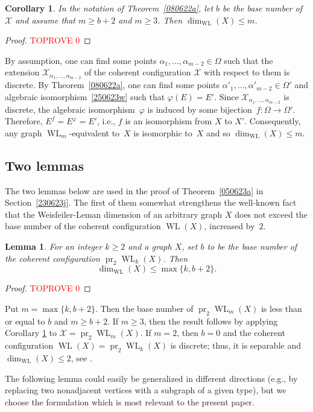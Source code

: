 \documentclass{amsart}
\newcommand{\cal}{\mathcal}
\newtheorem{corollary}[formula]{Corollary}
\newtheorem{lemma}[formula]{Lemma}
\def\lmml#1{\begin{lemma}\label{#1}}
\def\elmm{\end{lemma}}
\def\prf{\begin{proof}\textcolor{red}{TOPROVE 0}\end{proof}}
\def\cX{{\cal X}}
\DeclareMathOperator{\pr}{pr}
\DeclareMathOperator{\WL}{WL}
\begin{document}
\begin{corollary}\label{coro1}
In the notation of Theorem~\ref{080622a}, 
let $b$ be the base number of $\cX$ and assume that 
$m\geq b+2$ and $m\geq 3$. 
Then $\dim_{\scriptscriptstyle\WL}(X)\le m$.
\end{corollary}
\prf
By assumption, 
one can find some points $\alpha_1,\ldots,\alpha_{m-2}\in\Omega$ 
such that the extension $\cX_{\alpha_1,\ldots,\alpha_{m-2}}$ of 
the coherent configuration $\cX$ with respect to them is discrete. 
By Theorem~\ref{080622a}, one can 
find some points $\alpha'_1,\ldots,\alpha'_{m-2}\in\Omega'$ and algebraic isomorphism~\eqref{250623w} such that $\varphi(E)=E'$. 
Since $\cX_{\alpha_1,\ldots,\alpha_{m-2}}$ is discrete, 
the algebraic isomorphism~$\varphi$ is induced by some  bijection~$f\colon\Omega\to\Omega'$. Therefore, $E^f=E^\varphi=E'$, i.e., $f$ is an isomorphism from $X$ to $X'$. Consequently, any graph $\WL_m$-equivalent to~$X$ is isomorphic to~$X$ and so   $\dim_{\scriptscriptstyle\WL}(X)\le m$.
\eprf

\subsection{Two lemmas}
The two lemmas below are used in the proof of Theorem~\ref{050623a} in Section~\ref{230623j}. The first of them somewhat strengthens the well-known fact that the Weisfeiler-Leman dimension of an arbitrary graph $X$ does not exceed the base number of the coherent configuration $\WL(X)$, increased by~$2$.

\lmml{090623a}
For an integer $k\ge 2$ and a graph $X$, set $b$ to be 
the base number of the coherent configuration $\pr_2 \WL_{k}(X)$. 
Then
$$
\dim_{\scriptscriptstyle\WL}(X)\le\max\{k,b+2\}.
$$
\elmm
\prf
Put $m=\max\{k,b+2\}$. Then the base number of 
$\pr_2\WL_{m}(X)$ is less than or equal to $b$ and 
$m\geq b+2$. 
If $m\geq 3$, then the result follows by 
applying Corollary \ref{coro1} to $\cX=\pr_2\WL_{m}(X)$.
If $m=2$, then $b=0$ and the coherent configuration 
$\WL(X)=\pr_2 \WL_k(X)$ is discrete; thus, it is separable 
and $\dim_{\scriptscriptstyle\WL}(X)\le 2$, see \cite[Theorem~2.5]{Fuhlbr2018a}. 
\eprf 

The following lemma could  easily be generalized in different directions (e.g., by replacing two nonadjacent vertices with 
a subgraph of a given type), but we choose the formulation which 
is most relevant to the present paper.
\end{document}
